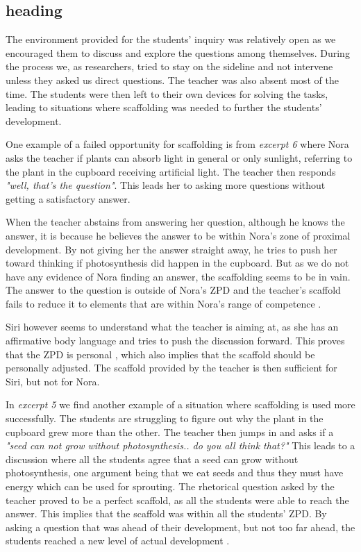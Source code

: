 \subsection{heading}
The environment provided for the students' inquiry was relatively open as we encouraged them to discuss and explore the questions among themselves. During the process we, as researchers, tried to stay on the sideline and not intervene unless they asked us direct questions. The teacher was also absent most of the time. The students were then left to their own devices for solving the tasks, leading to situations where scaffolding was needed to further the students' development. 

One example of a failed opportunity for scaffolding is from \emph{excerpt 6} where Nora asks the teacher if plants can absorb light in general or only sunlight, referring to the plant in the cupboard receiving artificial light. The teacher then responds \emph{"well, that's the question"}. This leads her to asking more questions without getting a satisfactory answer. 

When the teacher abstains from answering her question, although he knows the answer, it is because he believes the answer to be within Nora's zone of proximal development. By not giving her the answer straight away, he tries to push her toward thinking if photosynthesis did happen in the cupboard. But as we do not have any evidence of Nora finding an answer, the scaffolding seems to be in vain. The answer to the question is outside of Nora's ZPD and the teacher's scaffold fails to reduce it to elements that are within Nora's range of competence \citep{wood1976role}. 

Siri however seems to understand what the teacher is aiming at, as she has an affirmative body language and tries to push the discussion forward. This proves that the ZPD is personal \citep{vygotskiui1978mind}, which also implies that the scaffold should be personally adjusted. The scaffold provided by the teacher is then sufficient for Siri, but not for Nora. 

In \emph{excerpt 5} we find another example of a situation where scaffolding is used more successfully. The students are struggling to figure out why the plant in the cupboard grew more than the other. The teacher then jumps in and asks if a \emph{"seed can not grow without photosynthesis.. do you all think that?"} This leads to a discussion where all the students agree that a seed can grow without photosynthesis, one argument being that we eat seeds and thus they must have energy which can be used for sprouting. The rhetorical question asked by the teacher proved to be a perfect scaffold, as all the students were able to reach the answer. This implies that the scaffold was within all the students' ZPD. By asking a question that was ahead of their development, but not too far ahead, the students reached a new level of actual development  \citep{vygotskiui1978mind}.

